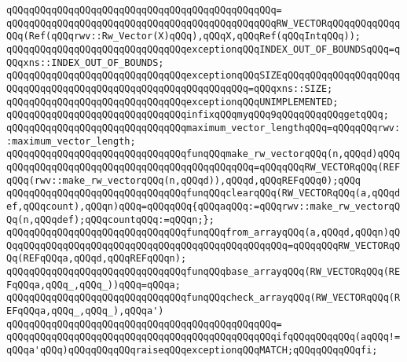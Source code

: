 \verb|qQQqqQQqqQQqqQQqqQQqqQQqqQQqqQQqqQQqqQQqqQQqqQQq=|\newline
\verb|qQQqqQQqqQQqqQQqqQQqqQQqqQQqqQQqqQQqqQQqqQQqqQQqRW_VECTORqQQqqQQqqQQqqQQq(Ref(qQQqrwv::Rw_Vector(X)qQQq),qQQqX,qQQqRef(qQQqIntqQQq));|\newline
\newline
\verb|qQQqqQQqqQQqqQQqqQQqqQQqqQQqqQQqexceptionqQQqINDEX_OUT_OF_BOUNDSqQQq=qQQqxns::INDEX_OUT_OF_BOUNDS;|\newline
\verb|qQQqqQQqqQQqqQQqqQQqqQQqqQQqqQQqexceptionqQQqSIZEqQQqqQQqqQQqqQQqqQQqqQQqqQQqqQQqqQQqqQQqqQQqqQQqqQQqqQQqqQQqqQQq=qQQqxns::SIZE;|\newline
\verb|qQQqqQQqqQQqqQQqqQQqqQQqqQQqqQQqexceptionqQQqUNIMPLEMENTED;|\newline
\newline
\verb|qQQqqQQqqQQqqQQqqQQqqQQqqQQqqQQqinfixqQQqmyqQQq9qQQqqQQqqQQqgetqQQq;|\newline
\newline
\verb|qQQqqQQqqQQqqQQqqQQqqQQqqQQqqQQqmaximum_vector_lengthqQQq=qQQqqQQqrwv::maximum_vector_length;|\newline
\newline
\verb|qQQqqQQqqQQqqQQqqQQqqQQqqQQqqQQqfunqQQqmake_rw_vectorqQQq(n,qQQqd)qQQqqQQqqQQqqQQqqQQqqQQqqQQqqQQqqQQqqQQqqQQqqQQq=qQQqqQQqRW_VECTORqQQq(REFqQQq(rwv::make_rw_vectorqQQq(n,qQQqd)),qQQqd,qQQqREFqQQq0);qQQq|\newline
\verb|qQQqqQQqqQQqqQQqqQQqqQQqqQQqqQQqfunqQQqclearqQQq(RW_VECTORqQQq(a,qQQqdef,qQQqcount),qQQqn)qQQq=qQQqqQQq{qQQqaqQQq:=qQQqrwv::make_rw_vectorqQQq(n,qQQqdef);qQQqcountqQQq:=qQQqn;};|\newline
\verb|qQQqqQQqqQQqqQQqqQQqqQQqqQQqqQQqfunqQQqfrom_arrayqQQq(a,qQQqd,qQQqn)qQQqqQQqqQQqqQQqqQQqqQQqqQQqqQQqqQQqqQQqqQQqqQQqqQQq=qQQqqQQqRW_VECTORqQQq(REFqQQqa,qQQqd,qQQqREFqQQqn);|\newline
\newline
\verb|qQQqqQQqqQQqqQQqqQQqqQQqqQQqqQQqfunqQQqbase_arrayqQQq(RW_VECTORqQQq(REFqQQqa,qQQq_,qQQq_))qQQq=qQQqa;|\newline
\newline
\verb|qQQqqQQqqQQqqQQqqQQqqQQqqQQqqQQqfunqQQqcheck_arrayqQQq(RW_VECTORqQQq(REFqQQqa,qQQq_,qQQq_),qQQqa')|\newline
\verb|qQQqqQQqqQQqqQQqqQQqqQQqqQQqqQQqqQQqqQQqqQQqqQQq=|\newline
\verb|qQQqqQQqqQQqqQQqqQQqqQQqqQQqqQQqqQQqqQQqqQQqqQQqifqQQqqQQqqQQq(aqQQq!=qQQqa'qQQq)qQQqqQQqqQQqraiseqQQqexceptionqQQqMATCH;qQQqqQQqqQQqfi;|\newline
